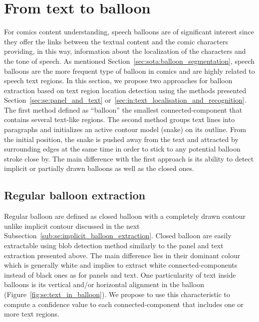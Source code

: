 


\section{From text to balloon} %
\label{sec:se:from_text_to_balloon}
For comics content understanding, speech balloons are of significant interest since they offer the links between the textual content and the comic characters providing, in this way, information about the localization of the characters and the tone of speech. 
As mentioned Section~\ref{sec:sota:balloon_segmentation}, speech balloons are the more frequent type of balloon in comics and are highly related to speech text regions.
In this section, we propose two approaches for balloon extraction based on text region location detection using the methods presented Section~\ref{sec:se:panel_and_text} or~\ref{sec:in:text_localisation_and_recognition}.
The first method defined as ``balloon'' the smallest connected-component that contains several text-like regions.
The second method groups text lines into paragraphs and initializes an active contour model (snake) on its outline.
From the initial position, the snake is pushed away from the text and attracted by surrounding edges at the same time in order to stick to any potential balloon stroke close by.
The main difference with the first approach is its ability to detect implicit or partially drawn balloons as well as the closed ones.

\subsection{Regular balloon extraction} %
\label{sub:se:regular_balloon_extraction}
Regular balloon are defined as closed balloon with a completely drawn contour unlike implicit contour discussed in the next Subsection~\ref{sub:se:implicit_balloon_extraction}.
Closed balloon are easily extractable using blob detection method similarly to the panel and text extraction presented above.
The main difference lies in their dominant colour which is generally white and implies to extract white connected-components instead of black ones as for panels and text.
One particularity of text inside balloons is its vertical and/or horizontal alignment in the balloon (Figure~\ref{fig:se:text_in_balloon}).
We propose to use this characteristic to compute a confidence value to each connected-component that includes one or more text regions.

